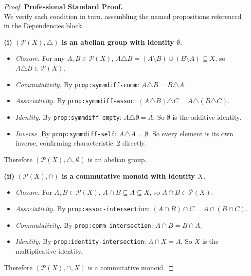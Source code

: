 \begin{proof}
\textbf{Professional Standard Proof.}~\\

We verify each condition in turn, assembling the named propositions
referenced in the Dependencies block.

\medskip
\noindent\textbf{(i) $(\mathcal{P}(X), \triangle)$ is an abelian group with
identity $\emptyset$.}

\begin{itemize}
  \item \textit{Closure.} For any $A, B \in \mathcal{P}(X)$,
    $A \triangle B = (A \setminus B) \cup (B \setminus A) \subseteq X$,
    so $A \triangle B \in \mathcal{P}(X)$.
  \item \textit{Commutativity.} By \texttt{prop:symmdiff-comm}:
    $A \triangle B = B \triangle A$.
  \item \textit{Associativity.} By \texttt{prop:symmdiff-assoc}:
    $(A \triangle B) \triangle C = A \triangle (B \triangle C)$.
  \item \textit{Identity.} By \texttt{prop:symmdiff-empty}:
    $A \triangle \emptyset = A$. So $\emptyset$ is the additive identity.
  \item \textit{Inverse.} By \texttt{prop:symmdiff-self}:
    $A \triangle A = \emptyset$. So every element is its own inverse,
    confirming characteristic~2 directly.
\end{itemize}

Therefore $(\mathcal{P}(X), \triangle, \emptyset)$ is an abelian group.

\medskip
\noindent\textbf{(ii) $(\mathcal{P}(X), \cap)$ is a commutative monoid
with identity $X$.}

\begin{itemize}
  \item \textit{Closure.} For $A, B \in \mathcal{P}(X)$, $A \cap B \subseteq
    A \subseteq X$, so $A \cap B \in \mathcal{P}(X)$.
  \item \textit{Associativity.} By \texttt{prop:assoc-intersection}:
    $(A \cap B) \cap C = A \cap (B \cap C)$.
  \item \textit{Commutativity.} By \texttt{prop:comm-intersection}:
    $A \cap B = B \cap A$.
  \item \textit{Identity.} By \texttt{prop:identity-intersection}:
    $A \cap X = A$. So $X$ is the multiplicative identity.
\end{itemize}

Therefore $(\mathcal{P}(X), \cap, X)$ is a commutative monoid.


\end{proof}
